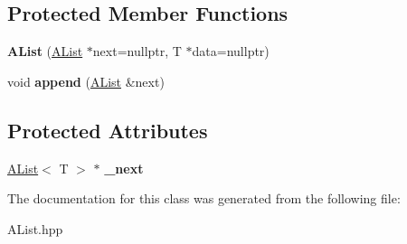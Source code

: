 \subsection*{Protected Member Functions}
\begin{DoxyCompactItemize}
\item 
\mbox{\label{classwood_box_1_1utility_1_1_a_list_a333eb2d9fa6833bba6675e2b5964ee4f}} 
{\bfseries A\+List} (\mbox{\hyperlink{classwood_box_1_1utility_1_1_a_list}{A\+List}} $\ast$next=nullptr, T $\ast$data=nullptr)
\item 
\mbox{\label{classwood_box_1_1utility_1_1_a_list_adc24a832d3c7446cf1958eb9acfeb49b}} 
void {\bfseries append} (\mbox{\hyperlink{classwood_box_1_1utility_1_1_a_list}{A\+List}} \&next)
\end{DoxyCompactItemize}
\subsection*{Protected Attributes}
\begin{DoxyCompactItemize}
\item 
\mbox{\label{classwood_box_1_1utility_1_1_a_list_a843caa997ee9f3339b7e2b804acd11b7}} 
\mbox{\hyperlink{classwood_box_1_1utility_1_1_a_list}{A\+List}}$<$ T $>$ $\ast$ {\bfseries \+\_\+next}
\end{DoxyCompactItemize}


The documentation for this class was generated from the following file\+:\begin{DoxyCompactItemize}
\item 
A\+List.\+hpp\end{DoxyCompactItemize}
